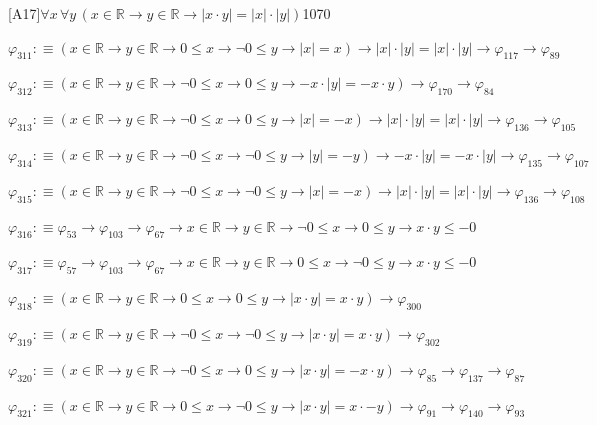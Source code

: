 \begin{fullproof}{[A17]}{$\forall x\,\forall y\,(x \in \mathbb{R} \to y \in \mathbb{R} \to \lvert x \cdot y \rvert = \lvert x \rvert \cdot \lvert y \rvert)$}{1070}
\begin{abbrevlist}
\item $\varphi_{311} :\equiv (x \in \mathbb{R} \to y \in \mathbb{R} \to 0 \leq x \to \neg 0 \leq y \to \lvert x \rvert = x) \to \lvert x \rvert \cdot \lvert y \rvert = \lvert x \rvert \cdot \lvert y \rvert \to \varphi_{117} \to \varphi_{89}$
\item $\varphi_{312} :\equiv (x \in \mathbb{R} \to y \in \mathbb{R} \to \neg 0 \leq x \to 0 \leq y \to -x \cdot \lvert y \rvert = -x \cdot y) \to \varphi_{170} \to \varphi_{84}$
\item $\varphi_{313} :\equiv (x \in \mathbb{R} \to y \in \mathbb{R} \to \neg 0 \leq x \to 0 \leq y \to \lvert x \rvert = -x) \to \lvert x \rvert \cdot \lvert y \rvert = \lvert x \rvert \cdot \lvert y \rvert \to \varphi_{136} \to \varphi_{105}$
\item $\varphi_{314} :\equiv (x \in \mathbb{R} \to y \in \mathbb{R} \to \neg 0 \leq x \to \neg 0 \leq y \to \lvert y \rvert = -y) \to -x \cdot \lvert y \rvert = -x \cdot \lvert y \rvert \to \varphi_{135} \to \varphi_{107}$
\item $\varphi_{315} :\equiv (x \in \mathbb{R} \to y \in \mathbb{R} \to \neg 0 \leq x \to \neg 0 \leq y \to \lvert x \rvert = -x) \to \lvert x \rvert \cdot \lvert y \rvert = \lvert x \rvert \cdot \lvert y \rvert \to \varphi_{136} \to \varphi_{108}$
\item $\varphi_{316} :\equiv \varphi_{53} \to \varphi_{103} \to \varphi_{67} \to x \in \mathbb{R} \to y \in \mathbb{R} \to \neg 0 \leq x \to 0 \leq y \to x \cdot y \leq -0$
\item $\varphi_{317} :\equiv \varphi_{57} \to \varphi_{103} \to \varphi_{67} \to x \in \mathbb{R} \to y \in \mathbb{R} \to 0 \leq x \to \neg 0 \leq y \to x \cdot y \leq -0$
\item $\varphi_{318} :\equiv (x \in \mathbb{R} \to y \in \mathbb{R} \to 0 \leq x \to 0 \leq y \to \lvert x \cdot y \rvert = x \cdot y) \to \varphi_{300}$
\item $\varphi_{319} :\equiv (x \in \mathbb{R} \to y \in \mathbb{R} \to \neg 0 \leq x \to \neg 0 \leq y \to \lvert x \cdot y \rvert = x \cdot y) \to \varphi_{302}$
\item $\varphi_{320} :\equiv (x \in \mathbb{R} \to y \in \mathbb{R} \to \neg 0 \leq x \to 0 \leq y \to \lvert x \cdot y \rvert = -x \cdot y) \to \varphi_{85} \to \varphi_{137} \to \varphi_{87}$
\item $\varphi_{321} :\equiv (x \in \mathbb{R} \to y \in \mathbb{R} \to 0 \leq x \to \neg 0 \leq y \to \lvert x \cdot y \rvert = x \cdot -y) \to \varphi_{91} \to \varphi_{140} \to \varphi_{93}$

\end{abbrevlist}
\end{fullproof}
